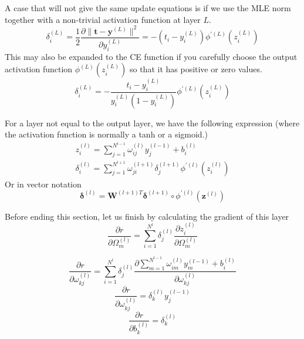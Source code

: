 \documentclass[a4paper,10pt]{article}
\theoremstyle{definition}
\begin{document}
A case that will not give the same update equations is if we use the MLE norm together with a non-trivial activation function at layer $L$.
\begin{equation}
\delta_i^{(L)} =\frac{1}{2} \frac{\partial \| \pmb{t} - \pmb{y}^{(L)} \|^2}{\partial y_i^{(L)}} = -(t_i - y_i^{(L)}) \phi^{'(L)}(z_i^{(L)})
\end{equation}
This may also be expanded to the CE function if you carefully choose the output activation function $\phi^{(L)}(z_i^{(L)})$ so that it has positive or zero values.
\begin{equation}
\delta_i^{(L)} = -\frac{t_i - y_i^{(L)}}{y^{(L)}_i(1 - y^{(L)}_i)} \phi^{'(L)}(z_i^{(L)})
\end{equation}


For a layer not equal to the output layer, we have the following expression (where the activation function is normally a tanh or a sigmoid.)
\begin{gather}
z_i^{(l)} = \sum_{j = 1}^{N^{l-1}}\omega_{ij}^{(l)} y_j^{(l-1)} + b^{(l)}_i \\
\delta^{(l)}_i = \sum_{j = 1}^{N^{l + 1}}\omega_{ji}^{(l+1)} \delta_j^{(l+1)}\phi^{'(l)}(z_i^{(l)})
\end{gather}
Or in vector notation
\begin{equation}
\pmb{\delta}^{(l)} = \pmb{W}^{(l+1)T} \pmb{\delta}^{(l+1)} \circ \phi^{'(l)}(\pmb{z}^{(l)})
\end{equation}

Before ending this section, let us finish by calculating the gradient of this layer
\begin{equation}
\frac{\partial r}{\partial \Omega^{(l)}_m} = \sum_{i = 1}^{N^{l}}\delta_j^{(l)} \frac{\partial z^{(l)}_i}{\partial \Omega^{(l)}_m}
\end{equation}

\begin{equation}
\frac{\partial r}{\partial \omega^{(l)}_{kj}} = \sum_{i = 1}^{N^{l}}\delta_j^{(l)} \frac{\partial \sum_{m = 1}^{N^{l-1}}\omega_{im}^{(l)} y_m^{(l-1)} + b^{(l)}_i}{\partial \omega^{(l)}_{kj}}
\end{equation}
\begin{equation}
\frac{\partial r}{\partial \omega^{(l)}_{kj}} = \delta_k^{(l)}y_j^{(l-1)}
\end{equation}
\begin{equation}
\frac{\partial r}{\partial b^{(l)}_{k}} = \delta_k^{(l)}
\end{equation}
\end{document}
